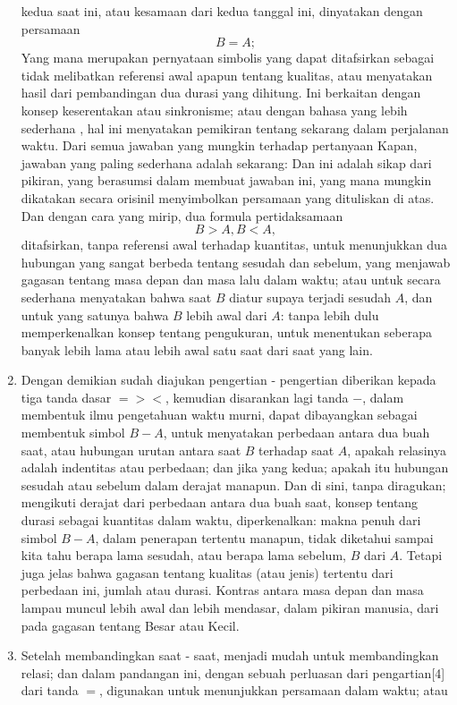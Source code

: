 \documentclass[a4paper, 12pt]{book}
\begin{document}
\begin{enumerate}
kedua saat ini, atau kesamaan dari kedua tanggal ini, dinyatakan dengan 
persamaan 
\[
B = A;
\]
Yang mana merupakan pernyataan simbolis yang dapat ditafsirkan sebagai
tidak melibatkan referensi awal  apapun tentang kualitas, atau menyatakan
hasil dari pembandingan dua durasi yang dihitung. Ini berkaitan dengan 
konsep keserentakan atau sinkronisme; atau dengan bahasa yang lebih sederhana
, hal ini menyatakan pemikiran tentang sekarang dalam perjalanan waktu. Dari
semua jawaban yang mungkin terhadap pertanyaan Kapan, jawaban yang paling
sederhana adalah sekarang: Dan ini adalah sikap dari pikiran, yang berasumsi
dalam membuat jawaban ini, yang mana mungkin dikatakan secara orisinil 
menyimbolkan persamaan yang dituliskan di atas. Dan dengan cara yang mirip,
dua formula pertidaksamaan
\[
B > A, B < A,
\]
ditafsirkan, tanpa referensi awal terhadap kuantitas, untuk menunjukkan
dua hubungan yang sangat berbeda tentang sesudah dan sebelum, yang menjawab
gagasan tentang masa depan dan masa lalu dalam waktu; atau untuk secara 
sederhana menyatakan bahwa saat $B$ diatur supaya terjadi sesudah $A$, 
dan untuk yang satunya bahwa $B$ lebih awal dari $A$: tanpa lebih dulu 
memperkenalkan konsep tentang pengukuran, untuk menentukan seberapa banyak
lebih lama atau lebih awal satu saat dari saat yang lain.
\item Dengan demikian sudah diajukan pengertian - pengertian diberikan 
kepada tiga tanda dasar $=><$, kemudian disarankan lagi tanda $-$, dalam 
membentuk ilmu pengetahuan waktu murni, dapat dibayangkan sebagai
membentuk simbol $B - A$, untuk menyatakan perbedaan antara dua buah saat,
atau hubungan urutan antara saat $B$ terhadap saat $A$, apakah relasinya
adalah indentitas atau perbedaan; dan jika yang kedua; apakah itu hubungan
sesudah atau sebelum dalam derajat manapun. Dan di sini, tanpa diragukan;
mengikuti derajat dari perbedaan antara dua buah saat, konsep tentang
durasi sebagai kuantitas dalam waktu, diperkenalkan: makna penuh dari
simbol $B-A$, dalam penerapan tertentu manapun, tidak diketahui sampai
kita tahu berapa lama sesudah, atau berapa lama sebelum, $B$ dari $A$.
Tetapi juga jelas bahwa gagasan tentang kualitas (atau jenis) tertentu
dari perbedaan ini, jumlah atau durasi. Kontras antara masa depan dan
masa lampau muncul lebih awal dan lebih mendasar, dalam pikiran manusia,
dari pada gagasan tentang Besar atau Kecil.
\item Setelah membandingkan saat - saat, menjadi mudah untuk membandingkan
relasi; dan dalam pandangan ini, dengan sebuah perluasan dari pengartian[4]
dari tanda $=$, digunakan untuk menunjukkan persamaan dalam waktu; atau

\end{enumerate}
\end{document}
